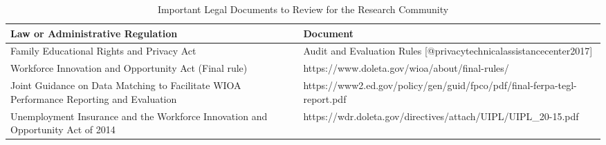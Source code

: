 \begin{table}[htb]

\caption{\label{tab:oldatable3}Important Legal Documents to Review for the Research Community}
\centering
\begin{tabulary}{\ourtablewidth}{LL}
\hline
Law or Administrative Regulation & Document\\
\hline
Family Educational Rights and Privacy Act & Audit and Evaluation Rules [@privacytechnicalassistancecenter2017]\\
\hline
Workforce Innovation and Opportunity Act (Final rule) & https://www.doleta.gov/wioa/about/final-rules/\\
\hline
Joint Guidance on Data Matching to Facilitate WIOA Performance Reporting and Evaluation & https://www2.ed.gov/policy/gen/guid/fpco/pdf/final-ferpa-tegl-report.pdf\\
\hline
Unemployment Insurance and the Workforce Innovation and Opportunity Act of 2014 & https://wdr.doleta.gov/directives/attach/UIPL/UIPL\_20-15.pdf\\
\hline
\end{tabulary}
\end{table}

